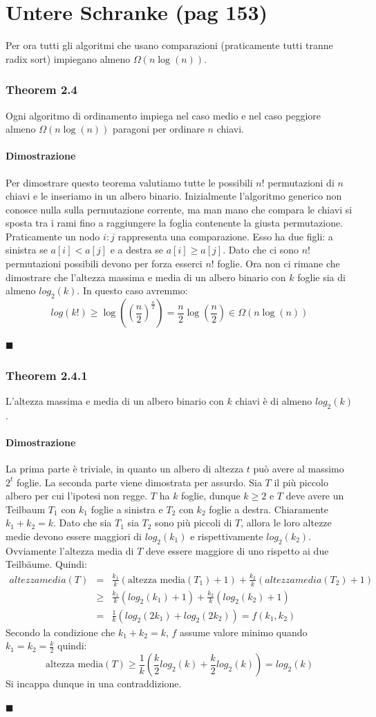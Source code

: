 \documentclass[a4paper]{book}
\newenvironment{mytheorem}[1]{\subsubsection*{Theorem #1}}{\begin{flushright}$\blacksquare$\end{flushright}}
\begin{document}
\section{Untere Schranke (pag 153)}
Per ora tutti gli algoritmi che usano comparazioni (praticamente tutti tranne radix sort) impiegano almeno $\Omega (n \log (n))$. 
\begin{mytheorem}{2.4}
Ogni algoritmo di ordinamento impiega nel caso medio e nel caso peggiore almeno $\Omega (n \log (n))$ paragoni per ordinare $n$ chiavi.
\paragraph*{Dimostrazione}
Per dimostrare questo teorema valutiamo tutte le possibili $n!$ permutazioni di $n$ chiavi e le inseriamo in un albero binario. Inizialmente l'algoritmo generico non conosce nulla sulla permutazione corrente, ma man mano che compara le chiavi si sposta tra i rami fino a raggiungere la foglia contenente la giusta permutazione. Praticamente un nodo $i:j$ rappresenta una comparazione. Esso ha due figli: a sinistra se $a[i]<a[j]$ e a destra se $a[i] \geq a[j]$. Dato che ci sono $n!$ permutazioni possibili devono per forza esserci $n!$ foglie. Ora non ci rimane che dimostrare che l'altezza massima e media di un albero binario con $k$ foglie sia di almeno $log_2 (k)$. In questo caso avremmo:
$$ log (k!) \geq \log ((\frac{n}{2})^{\frac{n}{2}}) = \frac{n}{2} \log (\frac{n}{2}) \in \Omega (n \log (n))$$
\end{mytheorem}
\begin{mytheorem}{2.4.1}
L'altezza massima e media di un albero binario con $k$ chiavi è di almeno $ log_2 (k)$.
\paragraph*{Dimostrazione}
La prima parte è triviale, in quanto un albero di altezza $t$ può avere al massimo $2^t$ foglie. La seconda parte viene dimostrata per assurdo. Sia $T$ il più piccolo albero per cui l'ipotesi non regge. $T$ ha $k$ foglie, dunque $k \geq 2$ e $T$ deve avere un Teilbaum $T_1$ con $k_1$ foglie a sinistra e $T_2$ con $k_2$ foglie a destra. Chiaramente $k_1+k_2=k$. Dato che sia $T_1$ sia $T_2$ sono più piccoli di $T$, allora le loro altezze medie devono essere maggiori di $log_2(k_1)$ e rispettivamente $log_2 (k_2)$. Ovviamente l'altezza media di $T$ deve essere maggiore di uno rispetto ai due Teilbäume. Quindi:
\begin{eqnarray}
 altezza media(T) &=&  \frac{k_1}{k}(\mbox{altezza media}(T_1)+1)+\frac{k_2}{k}(altezza media(T_2)+1)      \nonumber \\
   &\geq & \frac{k_1}{k}(log_2(k_1)+1)+\frac{k_2}{k}(log_2(k_2)+1) \nonumber \\
   &=&\frac{1}{k}(log_2(2k_1)+log_2(2k_2)) = f(k_1,k_2)
\end{eqnarray}
Secondo la condizione che $k_1+k_2=k$, $f$ assume valore minimo quando $k_1=k_2=\frac{k}{2}$ quindi:
$$ \mbox{altezza media}(T) \geq \frac{1}{k}(\frac{k}{2} log_2(k)+\frac{k}{2} log_2(k))=log_2 (k)$$
Si incappa dunque in una contraddizione.
\end{mytheorem}
\end{document}
